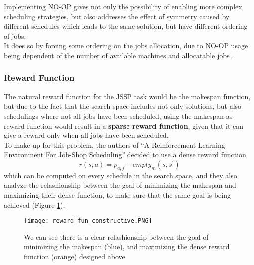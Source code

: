 \documentclass[12pt]{article}
\begin{document}
\medbreak
Implementing NO-OP gives not only the possibility of enabling more complex scheduling strategies, but
 also addresses the effect of symmetry caused by different schedules which leads to the same solution, but have different ordering of jobs.\\
 It does so by forcing some ordering on the jobs allocation, due to NO-OP usage being dependent of the number of available machines and allocatable jobs \cite{pierre_constructive_approach}.
 
\medbreak
\subsubsection{Reward Function}
The natural reward function for the JSSP task would be the makespan function, but due to the fact that the search space includes not only solutions, but also schedulings where not all jobs have been scheduled, using 
the makespan as reward function would result in a \textbf{sparse reward function}, given that it can give a reward only when all jobs have been scheduled.\\
To make up for this problem, the authors of ``A Reinforcement Learning Environment For Job-Shop Scheduling'' decided to use a dense reward function $$r(s,a) = p_{a,j}-empty_m(s,s^{'})$$
 which can be computed on every schedule in the search space, and they also analyze the relashionship between the goal of minimizing the makespan and maximizing their dense function, to make sure that the same goal is being achieved (Figure \ref{img:reward_constructive}).

\begin{figure}[H]
    \centering
    \texttt{[image: reward\_fun\_constructive.PNG]}
    \caption{We can see there is a clear relashionship between the goal of minimizing the makespan (blue), and maximizing the dense reward function (orange) designed above \cite{pierre_constructive_approach}}
    \label{img:reward_constructive}
\end{figure}

\medbreak
\end{document}
